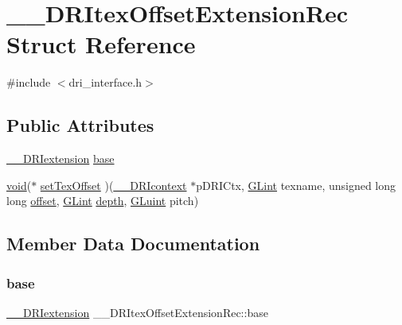 \hypertarget{struct_____d_r_itex_offset_extension_rec}{}\section{\+\_\+\+\_\+\+D\+R\+Itex\+Offset\+Extension\+Rec Struct Reference}
\label{struct_____d_r_itex_offset_extension_rec}


{\ttfamily \#include $<$dri\+\_\+interface.\+h$>$}

\subsection*{Public Attributes}
\begin{DoxyCompactItemize}
\item 
\hyperlink{dri__interface_8h_a4e0a61c8ece00d2b2c6792a9a1b55385}{\+\_\+\+\_\+\+D\+R\+Iextension} \hyperlink{struct_____d_r_itex_offset_extension_rec_a75c040a9b68575c6dd7f470edbe2dbc4}{base}
\item 
\hyperlink{_s_d_l__opengles2__gl2ext_8h_ae5d8fa23ad07c48bb609509eae494c95}{void}($\ast$ \hyperlink{struct_____d_r_itex_offset_extension_rec_a51d81b474170dc573b320c64c7fe8641}{set\+Tex\+Offset} )(\hyperlink{dri__interface_8h_a3fd295cba82b5a3d79f1ee7e12bfb908}{\+\_\+\+\_\+\+D\+R\+Icontext} $\ast$p\+D\+R\+I\+Ctx, \hyperlink{gl_8h_acebcc1c5663f14ebde1d16831e5fed94}{G\+Lint} texname, unsigned long long \hyperlink{glcorearb_8h_ac915cd848f42b26af51745f204a3b9af}{offset}, \hyperlink{gl_8h_acebcc1c5663f14ebde1d16831e5fed94}{G\+Lint} \hyperlink{gl_8h_aa8bd8cf1eef34712fdb6ad58b540a2ee}{depth}, \hyperlink{gl_8h_a68c4714e43d8e827d80759f9cb864f3c}{G\+Luint} pitch)
\end{DoxyCompactItemize}


\subsection{Member Data Documentation}
\mbox{\label{struct_____d_r_itex_offset_extension_rec_a75c040a9b68575c6dd7f470edbe2dbc4}} 
\subsubsection{\texorpdfstring{base}{base}}
{\footnotesize\ttfamily \hyperlink{dri__interface_8h_a4e0a61c8ece00d2b2c6792a9a1b55385}{\+\_\+\+\_\+\+D\+R\+Iextension} \+\_\+\+\_\+\+D\+R\+Itex\+Offset\+Extension\+Rec\+::base}

